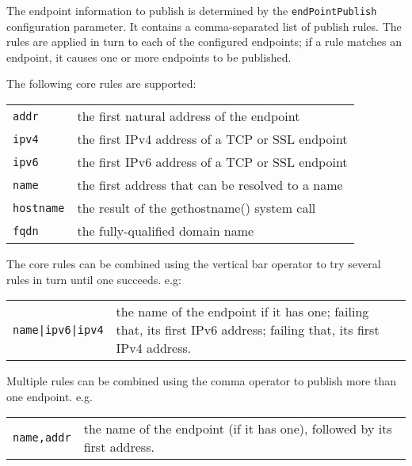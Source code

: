 \documentclass[11pt,twoside,a4paper]{book}
\newcommand{\code}[1]{\texttt{#1}}
\begin{document}
The endpoint information to publish is determined by the
\code{endPointPublish} configuration parameter. It contains a
comma-separated list of publish rules. The rules are applied in turn
to each of the configured endpoints; if a rule matches an endpoint, it
causes one or more endpoints to be published.

The following core rules are supported:

\vspace{\baselineskip}

\begin{tabular}{p{}p{}}
\code{addr} &     the first natural address of the endpoint\\
\code{ipv4} &     the first IPv4 address of a TCP or SSL endpoint\\
\code{ipv6} &     the first IPv6 address of a TCP or SSL endpoint\\
\code{name} &     the first address that can be resolved to a name\\
\code{hostname} & the result of the gethostname() system call\\
\code{fqdn} &     the fully-qualified domain name\\
\end{tabular}

\vspace{\baselineskip}

\noindent
The core rules can be combined using the vertical bar operator to
try several rules in turn until one succeeds. e.g:

\vspace{\baselineskip}

\begin{tabular}{p{}p{}}
\code{name|ipv6|ipv4} & the name of the endpoint if it has one;
                 	failing that, its first IPv6 address;
                 	failing that, its first IPv4 address.
\end{tabular}

\vspace{\baselineskip}

\noindent
Multiple rules can be combined using the comma operator to
publish more than one endpoint. e.g.

\vspace{\baselineskip}

\begin{tabular}{p{}p{}}
\code{name,addr} & the name of the endpoint (if it has one),
                   followed by its first address.
\end{tabular}
\end{document}
